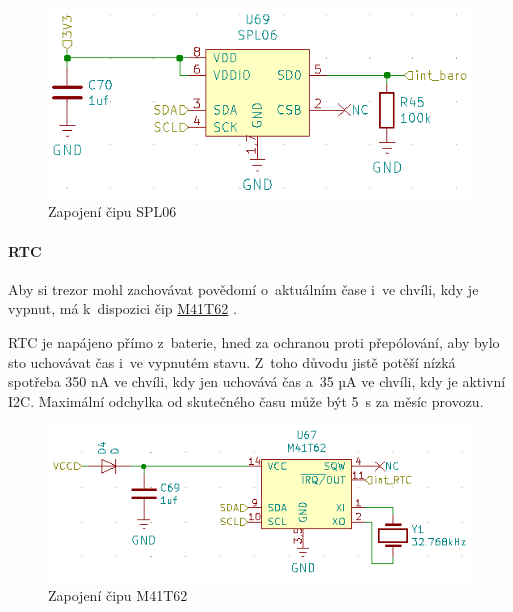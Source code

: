 \begin{figure}[h]
    \centering
    \includegraphics[width=\textwidth]{kapitoly/obrazky/E4/vnimani/SPL06.png}
    \caption{Zapojení čipu SPL06}
    \label{fig:E4-SPL06}
\end{figure}

\newpage

\paragraph{RTC}
\label{RTC}
Aby si trezor mohl zachovávat povědomí o~aktuálním čase i~ve chvíli, kdy je vypnut, má k~dispozici čip 
\href{https://datasheet.lcsc.com/szlcsc/STMicroelectronics-M41T62Q6F_C113207.pdf}{M41T62} \parencite{m41t62}.

RTC je napájeno přímo z~baterie, hned za ochranou proti přepólování, aby bylo sto uchovávat čas i~ve vypnutém stavu.
Z~toho důvodu jistě potěší nízká spotřeba 350 nA ve chvíli, kdy jen uchovává čas a~35 µA ve chvíli, kdy je aktivní I2C.
Maximální odchylka od skutečného času může být 5~s za měsíc provozu.

\begin{figure}[h]
    \centering
    \includegraphics[width=\textwidth]{kapitoly/obrazky/E4/vnimani/RTC.png}
    \caption{Zapojení čipu M41T62}
    \label{fig:E4-M41T62}
\end{figure}

\newpage

